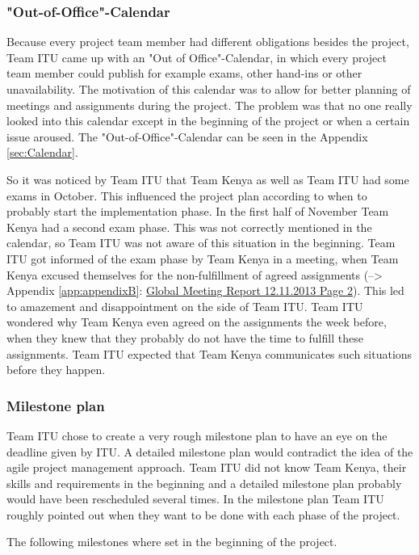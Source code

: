 \subsubsection{"Out-of-Office"-Calendar}

Because every project team member had different obligations besides the project, Team ITU came up with an "Out of Office"-Calendar, in which every project team member could publish for example exams, other hand-ins or other unavailability. The motivation of this calendar was to allow for better planning of meetings and assignments during the project. The problem was that no one really looked into this calendar except in the beginning of the project or when a certain issue aroused. The "Out-of-Office"-Calendar can be seen in the Appendix \ref{sec:Calendar}.

So it was noticed by Team ITU that Team Kenya as well as Team ITU had some exams in October. This influenced the project plan according to when to probably start the implementation phase. In the first half of November Team Kenya had a second exam phase. This was not correctly mentioned in the calendar, so Team ITU was not aware of this situation in the beginning. Team ITU got informed of the exam phase by Team Kenya in a meeting, when Team Kenya excused themselves for the non-fulfillment of agreed assignments (--> Appendix \ref{app:appendixB}: \hyperlink{GSD20131112.2}{Global Meeting Report 12.11.2013 Page 2}). This led to amazement and disappointment on the side of Team ITU. Team ITU wondered why Team Kenya even agreed on the assignments the week before, when they knew that they probably do not have the time to fulfill these assignments. Team ITU expected that Team Kenya communicates such situations before they happen.

\subsubsection{Milestone plan}
Team ITU chose to create a very rough milestone plan to have an eye on the deadline given by ITU. A detailed milestone plan would contradict the idea of the agile project management approach. Team ITU did not know Team Kenya, their skills and requirements in the beginning and a detailed milestone plan probably would have been rescheduled several times. In the milestone plan Team ITU roughly pointed out when they want to be done with each phase of the project.

The following milestones where set in the beginning of the project.

